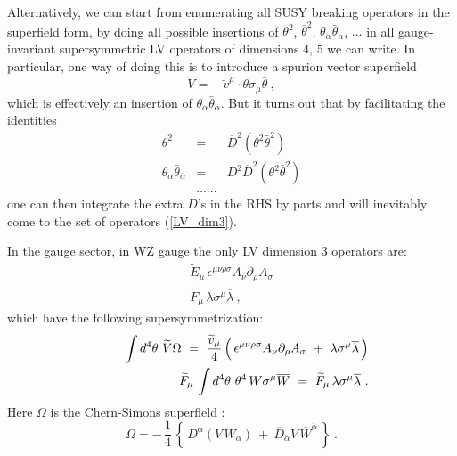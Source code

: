\documentclass[a4paper,12pt]{article}
\begin{document}
	Alternatively, we can start from enumerating 
	all SUSY breaking operators in the superfield form, by
	doing all possible insertions of $ \theta^2 $, 
	$ \bar{\theta}^2 $, 
	$ \theta_\alpha \bar{\theta}_{\dot\alpha} $, 
	$ \dots $ in all
	gauge-invariant supersymmetric LV operators of dimensions 4, 5
	we can write.
	In particular, one way of doing this 
\cite{GrootNibbelink:2004za}
	is to introduce a spurion vector superfield
\[
	\widetilde{V} = -\, \widetilde{v}^\mu \cdot 
	\theta \sigma_\mu \bar{\theta}~,
\]
	which is effectively an insertion of 	
	$ \theta_\alpha \bar{\theta}_{\dot\alpha} $.
	But it turns out that by facilitating the identities
\begin{eqnarray*}
	\theta^2 & = & \overline{D}^2 ( \theta^2 \bar{\theta}^2 ) \\
	\theta_\alpha \bar{\theta}_{\dot\alpha} & = &
		D^2 \overline{D}^2 ( \theta^2 \bar{\theta}^2 ) \\
	         & \ldots\ldots &
\end{eqnarray*}
	one can then integrate the extra $ D $'s in the RHS by parts
	and will inevitably come to the set of operators (\ref{LV_dim3}).
	
	In the gauge sector, in WZ gauge the only LV dimension 3 
	operators are:
\begin{eqnarray}
\nonumber
	& 
	\widetilde{E}_\mu\, \epsilon^{\mu\nu\rho\sigma}
		A_\nu \partial_\rho A_\sigma  &\\
\nonumber
	&
	\widetilde{F}_\mu\, \lambda \sigma^\mu \overline{\lambda} 
	~, &
\end{eqnarray}
	which have the following supersymmetrization:
\begin{eqnarray*}
	&&
	\phantom{\widetilde{F}_\mu\,}
	\int d^4\theta~ \widetilde{V} \Omega 
	~ = ~
	   \frac{\widetilde{v}_\mu}{4}\,
	\Bigl(\, 
		\epsilon^{\mu\nu\rho\sigma}
		A_\nu \partial_\rho A_\sigma
		~+~
		\lambda \sigma^\mu \overline{\lambda}
	        \,
	\Bigr) \\
	&&
	\widetilde{F}_\mu\, \int d^4\theta~ \theta^4\, 
		W \sigma^\mu \overline{W} 
	~ = ~
	\widetilde{F}_\mu\, \lambda \sigma^\mu \overline{\lambda}~.
\end{eqnarray*}
	Here $ \Omega $ is the Chern-Simons superfield
\cite{Cecotti:1987nw}:
\[
	\Omega = -\, \frac{1}{4}\,
		\left\{\, 
			D^\alpha (V\, W_\alpha) 
			~+~
			\overline{D}_{\dot\alpha}V\,
				\overline{W}^{\dot\alpha}
			\,
		\right\}~.
\]
	
\end{document}
